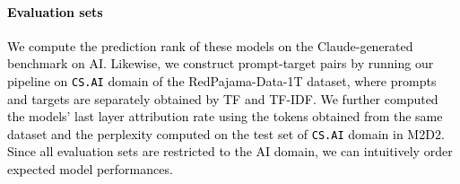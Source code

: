 \documentclass[10pt]{article}
\newcommand{\revision}[1]{\textcolor{black}{#1}}
\begin{document}
\paragraph{\revision{Evaluation sets}}
\revision{We compute the prediction rank of these models on the Claude-generated benchmark on AI. Likewise, we construct prompt-target pairs by running our pipeline on \texttt{CS.AI} domain of the RedPajama-Data-1T dataset, where prompts and targets are separately obtained by TF and TF-IDF. We further computed the models' last layer attribution rate using the tokens obtained from the same dataset and the perplexity computed on the test set of \texttt{CS.AI} domain in M2D2. Since all evaluation sets are restricted to the AI domain, we can intuitively order expected model performances.}



\end{document}
